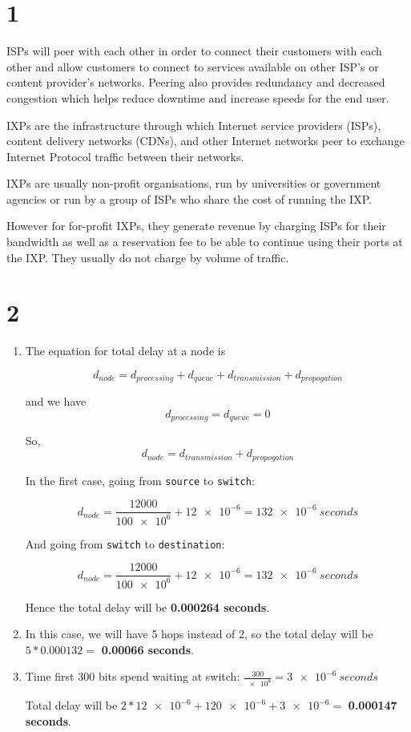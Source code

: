 \documentclass[12pt,letterpaper]{article}
\begin{document}
\section*{1}

ISPs will peer with each other in order to connect their customers with each other and allow customers to connect to services available on other ISP's or content provider's networks. Peering also provides redundancy and decreased congestion which helps reduce downtime and increase speeds for the end user.

IXPs are the infrastructure through which Internet service providers (ISPs), content delivery networks (CDNs), and other Internet networks peer to exchange Internet Protocol traffic between their networks.\cite{IXP}

IXPs are usually non-profit organisations, run by universities or government agencies or run by a group of ISPs who share the cost of running the IXP.

However for for-profit IXPs, they generate revenue by charging ISPs for their bandwidth as well as a reservation fee to be able to continue using their ports at the IXP. They usually do not charge by volume of traffic.\cite{IXP}

\section*{2}
\begin{enumerate}
  \item The equation for total delay at a node is
  
  $$d_{node} = d_{processing} + d_{queue} + d_{transmission} + d_{propogation}$$
  
  and we have $$d_{processing} = d_{queue} = 0$$
  
  So, $$d_{node} = d_{transmission} + d_{propogation}$$
  
  In the first case, going from \texttt{source} to \texttt{switch}:
  
  $$d_{node} = \frac{12000}{\num{100e6}} + \num{12e-6} = \SI{132e-6}{seconds}$$
  
  And going from \texttt{switch} to \texttt{destination}:
  
  $$d_{node} = \frac{12000}{\num{100e6}} + \num{12e-6} = \SI{132e-6}{seconds}$$
  
  Hence the total delay will be \textbf{0.000264 seconds}.
  
  \item In this case, we will have 5 hops instead of 2, so the total delay will be $5 * 0.000132 =$ \textbf{0.00066 seconds}.
  
  \item Time first 300 bits spend waiting at switch: $\frac{300}{\num{e8}} = \SI{3e-6}{seconds}$
  
  Total delay will be $2*\num{12e-6} + \num{120e-6} +  \num{3e-6} =$ \textbf{0.000147 seconds}.
\end{enumerate}
\end{document}
